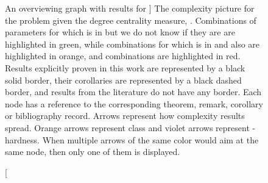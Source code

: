 \begin{figure}[t]
    \caption
    [An overviewing graph with results for \HLdeg]
    {
        The complexity picture for the \HL problem given the degree centrality measure, \HLdeg.
        Combinations of parameters for which \HLdeg is in \XP but we do not know if they are \Wh are highlighted in green,
        while combinations for which \HLdeg is in \XP and also \Wh are highlighted in orange,
        and \pNPh combinations are highlighted in red.
        Results explicitly proven in this work are represented by a black solid border,
        their corollaries are represented by a black dashed border, and
        results from the literature do not have any border.
        Each node has a reference to the corresponding theorem, remark, corollary or bibliography record.
        Arrows represent how complexity results spread.
        Orange arrows represent \XP class and violet arrows represent \Wone-hardness.
        When multiple arrows of the same color would aim at the same node,
        then only one of them is displayed.  
    }
    \label{fig:complexityPicture}
\end{figure}
